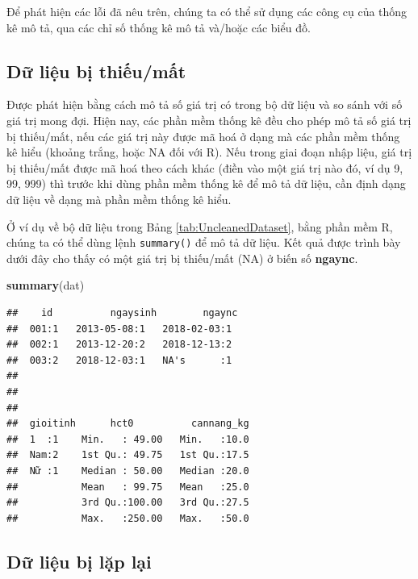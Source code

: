 \documentclass[]{tufte-book}
\newenvironment{Shaded}{}{}
\newcommand{\KeywordTok}[1]{\textcolor[rgb]{0.00,0.44,0.13}{\textbf{#1}}}
\newcommand{\NormalTok}[1]{#1}
\begin{document}
Để phát hiện các lỗi đã nêu trên, chúng ta có thể sử dụng các công cụ của thống kê mô tả, qua các chỉ số thống kê mô tả và/hoặc các biểu đồ.

\hypertarget{d-liu-bi-thiumt}{%
\subsection{Dữ liệu bị thiếu/mất}\label{d-liu-bi-thiumt}}

Được phát hiện bằng cách mô tả số giá trị có trong bộ dữ liệu và so sánh với số giá trị mong đợi. Hiện nay, các phần mềm thống kê đều cho phép mô tả số giá trị bị thiếu/mất, nếu các giá trị này được mã hoá ở dạng mà các phần mềm thống kê hiểu (khoảng trắng, hoặc NA đối với R). Nếu trong giai đoạn nhập liệu, giá trị bị thiếu/mất được mã hoá theo cách khác (điền vào một giá trị nào đó, ví dụ 9, 99, 999) thì trước khi dùng phần mềm thống kê để mô tả dữ liệu, cần định dạng dữ liệu về dạng mà phần mềm thống kê hiểu.

Ở ví dụ về bộ dữ liệu trong Bảng \ref{tab:UncleanedDataset}, bằng phần mềm R, chúng ta có thể dùng lệnh \texttt{summary()} để mô tả dữ liệu. Kết quả được trình bày dưới đây cho thấy có một giá trị bị thiếu/mất (NA) ở biến số \textbf{ngaync}.

\begin{Shaded}
\begin{Highlighting}[]
\KeywordTok{summary}\NormalTok{(dat)}
\end{Highlighting}
\end{Shaded}

\begin{verbatim}
##    id          ngaysinh        ngaync 
##  001:1   2013-05-08:1   2018-02-03:1  
##  002:1   2013-12-20:2   2018-12-13:2  
##  003:2   2018-12-03:1   NA's      :1  
##                                       
##                                       
##                                       
##  gioitinh      hct0          cannang_kg  
##  1  :1    Min.   : 49.00   Min.   :10.0  
##  Nam:2    1st Qu.: 49.75   1st Qu.:17.5  
##  Nữ :1    Median : 50.00   Median :20.0  
##           Mean   : 99.75   Mean   :25.0  
##           3rd Qu.:100.00   3rd Qu.:27.5  
##           Max.   :250.00   Max.   :50.0
\end{verbatim}

\hypertarget{d-liu-bi-lp-lai}{%
\subsection{Dữ liệu bị lặp lại}\label{d-liu-bi-lp-lai}}
\end{document}
